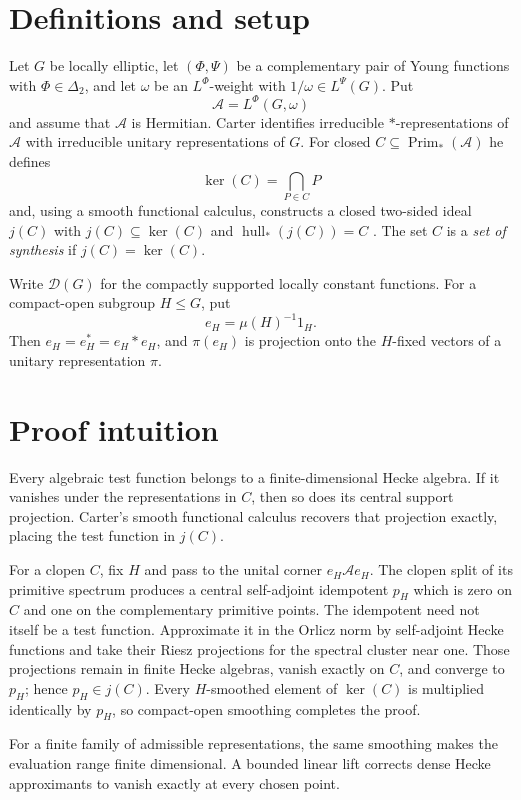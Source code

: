 \documentclass[11pt]{article}
\newcommand{\A}{\mathcal A}
\newcommand{\D}{\mathcal D}
\newcommand{\Prim}{\operatorname{Prim}}
\newcommand{\hull}{\operatorname{hull}}
\begin{document}
\section{Definitions and setup}

Let $G$ be locally elliptic, let $(\Phi,\Psi)$ be a complementary pair of
Young functions with $\Phi\in\Delta_2$, and let $\omega$ be an
$L^\Phi$-weight with $1/\omega\in L^\Psi(G)$.  Put
\[
  \A=L^\Phi(G,\omega)
\]
and assume that $\A$ is Hermitian.  Carter identifies irreducible
$*$-representations of $\A$ with irreducible unitary representations of $G$.
For closed $C\subseteq\Prim_*(\A)$ he defines
\[
 \ker(C)=\bigcap_{P\in C}P
\]
and, using a smooth functional calculus, constructs a closed two-sided ideal
$j(C)$ with $j(C)\subseteq\ker(C)$ and $\hull_*(j(C))=C$
\cite[Theorem 7.1]{Carter}.  The set $C$ is a \emph{set of synthesis} if
$j(C)=\ker(C)$.

Write $\D(G)$ for the compactly supported locally constant functions.  For a
compact-open subgroup $H\leq G$, put
\[
 e_H=\mu(H)^{-1}1_H.
\]
Then $e_H=e_H^*=e_H*e_H$, and $\pi(e_H)$ is projection onto the $H$-fixed
vectors of a unitary representation $\pi$.

\section{Proof intuition}

Every algebraic test function belongs to a finite-dimensional Hecke algebra.
If it vanishes under the representations in $C$, then so does its central
support projection.  Carter's smooth functional calculus recovers that
projection exactly, placing the test function in $j(C)$.

For a clopen $C$, fix $H$ and pass to the unital corner $e_H\A e_H$.  The
clopen split of its primitive spectrum produces a central self-adjoint
idempotent $p_H$ which is zero on $C$ and one on the complementary primitive
points.  The idempotent need not itself be a test function.  Approximate it
in the Orlicz norm by self-adjoint Hecke functions and take their Riesz
projections for the spectral cluster near one.  Those projections remain in
finite Hecke algebras, vanish exactly on $C$, and converge to $p_H$; hence
$p_H\in j(C)$.  Every $H$-smoothed element of $\ker(C)$ is multiplied
identically by $p_H$, so compact-open smoothing completes the proof.

For a finite family of admissible representations, the same smoothing makes
the evaluation range finite dimensional.  A bounded linear lift corrects
dense Hecke approximants to vanish exactly at every chosen point.
\end{document}
